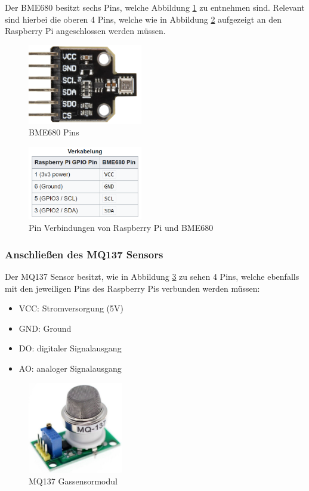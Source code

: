 \documentclass[conference]{IEEEtran}
\begin{document}
Der BME680 besitzt sechs Pins, welche Abbildung \ref{bme_pins} zu entnehmen sind. Relevant sind hierbei die oberen 4 Pins, welche wie in Abbildung \ref{verkabelung_bme} aufgezeigt an den Raspberry Pi angeschlossen werden müssen. \cite{bme_anschluss}
\begin{figure}[H]
	\centering
	\includegraphics[width=50mm]{fig/bme_pins.png}
	\caption{BME680 Pins}
	\label{bme_pins}
\end{figure}
\begin{figure}[H]
	\centerline{\includegraphics[width=50mm]{fig/verkabelung_bme.png}}
	\caption{Pin Verbindungen von Raspberry Pi und BME680}
	\label{verkabelung_bme}
\end{figure}

\subsubsection{Anschließen des MQ137 Sensors} 

Der MQ137 Sensor besitzt, wie in Abbildung \ref{mq137_pins} zu sehen 4 Pins, welche ebenfalls mit den jeweiligen Pins des Raspberry Pis verbunden werden müssen:
\begin{itemize}
	\item VCC: Stromversorgung (5V)
	\item GND: Ground
	\item DO: digitaler Signalausgang
	\item AO: analoger Signalausgang
\end{itemize}
\begin{figure}[H]
	\centerline{\includegraphics[height=40mm]{fig/mq137_pins.png}}
	\caption{MQ137 Gassensormodul}
	\label{mq137_pins}
\end{figure}
\end{document}
